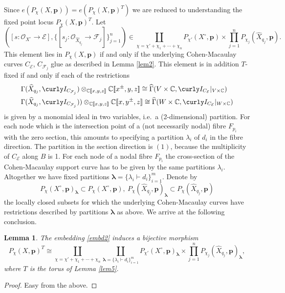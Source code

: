 \documentclass[12pt]{amsart}
\newtheorem{lemma}[theorem]{Lemma}
\theoremstyle{definition}
\theoremstyle{property}
\newcommand\I{\curly I}
\renewcommand\O{\mathcal O}
\newcommand\cE{\mathcal E}
\newcommand\F{\mathcal F}
\newcommand\p{\mathbf{p}}
\newcommand\bslambda{\boldsymbol{\lambda}}
\newcommand\C{\mathbb C}
\renewcommand\_{^{}_}
\begin{document}
Since $e(P_\chi(X,\p)) = e(P_\chi(X,\p)^T)$ we are reduced to understanding the fixed point locus $P_\chi(X,\p)^T$. Let 
\[
([s : \O_{X^\circ} \rightarrow \cE], \{ [s_j : \O_{\widehat{X}_{q_j}} \rightarrow \F_j] \}_{j=1}^{n} ) \in \coprod_{\chi = \chi' + \chi_1 +  \cdots + \chi_n}  P_{\chi'}(X^{\circ},\p) \times \prod_{j=1}^{n} P_{\chi_j}(\widehat{X}_{q_j},\p).
\]
This element lies in $P_\chi(X,\p)$ if and only if the underlying Cohen-Macaulay curves $C_{\cE}$, $C_{\F_j}$ glue as described in Lemma \ref{lem2}. This element is in addition $T$-fixed if and only if each of the restrictions
\begin{align*}
&\Gamma(\widehat{X}_{q_j}, \I_{C_{\F_j}}) \otimes_{\C[\![x,y,z]\!]} \C[\![x^{\pm},y,z]\!] \cong \widehat{\Gamma}(V \times \C, \I_{C_{\cE}}|_{V \times \C}) \\
&\Gamma(\widehat{X}_{q_j}, \I_{C_{\F_j}})) \otimes_{\C[\![x,y,z]\!]} \C[\![x,y^{\pm},z]\!] \cong \widehat{\Gamma}(W \times \C, \I_{C_{\cE}}|_{W \times \C}) 
\end{align*}
is given by a monomial ideal in two variables, i.e.~a (2-dimensional) partition. For each node which is the intersection point of a (not necessarily nodal) fibre $F_{p_i}$ with the zero section, this amounts to specifying a partition $\lambda_i$ of $d_i$ in the fibre direction. The partition in the section direction is $(1)$, because the multiplicity of $C_{\cE}$ along $B$ is 1. For each node of a nodal fibre $F_{p_i}$ the cross-section of the Cohen-Macaulay support curve has to be given by the same partitions $\lambda_i$. Altogether we have fixed partitions $\bslambda = \{\lambda_i \vdash d_i\}_{i=1}^{m}$. Denote by 
$$
P_{\chi}(X^{\circ},\p)_{\bslambda} \subset P_{\chi}(X^{\circ},\p), \  P_{\chi}(\widehat{X}_{q_j},\p)_{\bslambda} \subset P_{\chi}(\widehat{X}_{q_j},\p)
$$
the locally closed subsets for which the underlying Cohen-Macaulay curves have restrictions described by partitions $\bslambda$ as above. We arrive at the following conclusion.
\begin{lemma} \label{lem6}
The embedding \eqref{embd2} induces a bijective morphism
$$
P_\chi(X,\p)^T \cong \coprod_{\chi = \chi' + \chi_1 +  \cdots + \chi_n} \coprod_{\bslambda = \{\lambda_i \vdash d_i\}_{i=1}^{m}}  P_{\chi'}(X^{\circ},\p)_{\bslambda} \times \prod_{j=1}^{n} P_{\chi_j}(\widehat{X}_{q_j},\p)_{\bslambda},
$$
where $T$ is the torus of Lemma \ref{lem5}.
\end{lemma}
\begin{proof}
Easy from the above.
\end{proof}
\end{document}
